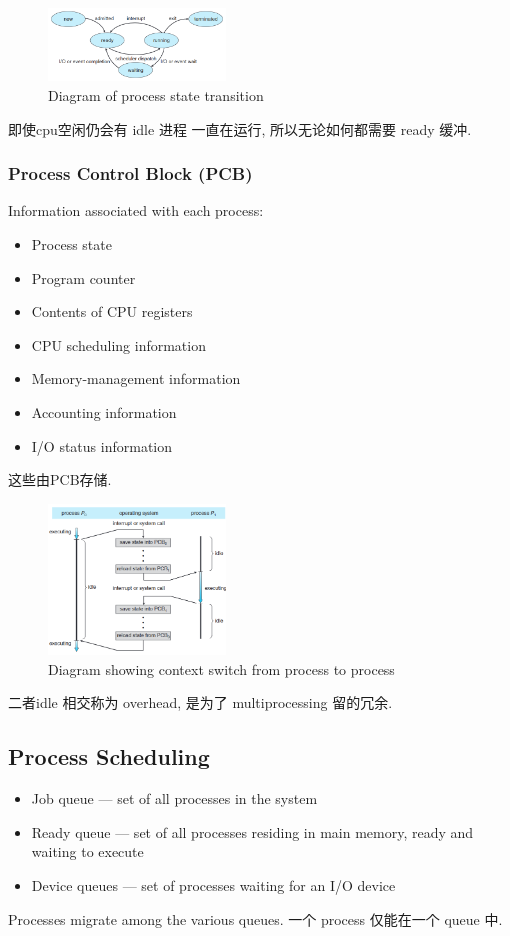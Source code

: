\begin{figure}[!htb]
    \centering
    \includegraphics[width=0.42\textwidth]{pic/OS3/Diagram of process state.png}
    \caption{Diagram of process state transition}
\end{figure}
即使cpu空闲仍会有 idle 进程 一直在运行, 所以无论如何都需要 ready 缓冲. 

\subsubsection{Process Control Block (PCB)}
Information associated with each process: 
\begin{itemize}
    \item Process state
    \item Program counter
    \item Contents of CPU registers
    \item CPU scheduling information
    \item Memory-management information
    \item Accounting information
    \item I/O status information
\end{itemize}
这些由PCB存储.

\begin{figure}[!htb]
    \centering
    \includegraphics[width=0.42\textwidth]{pic/OS3/Diagram showing context switch from process to process}
    \caption{Diagram showing context switch from process to process}
\end{figure}
二者idle 相交称为 overhead, 是为了 multiprocessing 留的冗余. 

\subsection{Process Scheduling}
\begin{itemize}
    \item Job queue --- set of all processes in the system
    \item Ready queue --- set of all processes residing in main memory, ready and waiting to execute
    \item Device queues --- set of processes waiting for an I/O device
\end{itemize}
Processes migrate among the various queues. 一个 process 仅能在一个 queue 中. 

